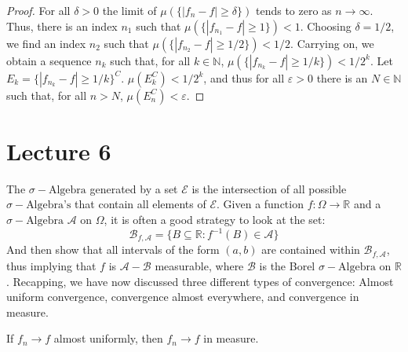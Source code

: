             \begin{proof}
                For all $\delta>0$ the limit of
                $\mu(\{|f_{n}-f|\geq\delta\})$ tends to zero
                as $n\rightarrow\infty$. Thus, there is an
                index $n_{1}$ such that
                $\mu(\{|f_{n_{1}}-f|\geq{1}\})<1$. Choosing
                $\delta=1/2$, we find an index $n_{2}$ such that
                $\mu(\{|f_{n_{2}}-f|\geq1/2\})<1/2$.
                Carrying on, we obtain a sequence $n_{k}$ such
                that, for all $k\in\mathbb{N}$,
                $\mu(\{|f_{n_{k}}-f|\geq1/k\})<1/2^{k}$.
                Let $E_{k}=\{|f_{n_{k}}-f|\geq1/k\}^{C}$.
                $\mu(E_{k}^{C})<1/2^{k}$, and thus for all
                $\varepsilon>0$ there is an $N\in\mathbb{N}$
                such that, for all $n>N$,
                $\mu(E_{n}^{C})<\varepsilon$.
            \end{proof}
        \section{Lecture 6}
            The $\sigma-\textrm{Algebra}$ generated by
            a set $\mathcal{E}$ is the intersection of all
            possible $\sigma-\textrm{Algebra's}$ that contain
            all elements of $\mathcal{E}$. Given a function
            $f:\Omega\rightarrow\mathbb{R}$ and a
            $\sigma-\textrm{Algebra}$ $\mathcal{A}$ on
            $\Omega$, it is often a good strategy to look at
            the set:
            \begin{equation}
                \mathcal{B}_{f,\mathcal{A}}=
                    \big\{
                        B\subseteq\mathbb{R}:
                        f^{-1}(B)\in\mathcal{A}
                    \big\}
            \end{equation}
            And then show that all intervals of the form
            $(a,b)$ are contained within
            $\mathcal{B}_{f,\mathcal{A}}$, thus implying
            that $f$ is $\mathcal{A}-\mathcal{B}$ measurable,
            where $\mathcal{B}$ is the Borel
            $\sigma-\textrm{Algebra}$ on $\mathbb{R}$.
            Recapping, we have now discussed three different
            types of convergence: Almost uniform convergence,
            convergence almost everywhere, and convergence in
            measure.
            \begin{theorem}
                If $f_{n}\rightarrow{f}$ almost uniformly,
                then $f_{n}\rightarrow{f}$ in measure.
            \end{theorem}
